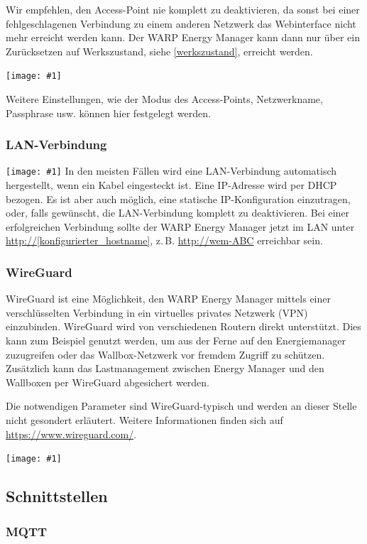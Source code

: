 \documentclass[a4paper,10pt]{article}
\newcommand{\hint}[1]{\begin{tcolorbox}[colback=boxgray,colframe=black,coltext=
white,title=Hinweis,left*=2mm,right*=2mm,boxsep=1mm,bottom=1mm,top=1mm]#1\end{tcolorbox}}
\newcommand{\gfx}[1]{\texttt{[image: \#1]}}
\begin{document}
\begin{multicols*}{2}
	\hint{Wir empfehlen, den Access-Point nie komplett zu deaktivieren, da sonst bei einer
		fehlgeschlagenen Verbindung zu einem anderen Netzwerk das Webinterface nicht mehr erreicht
		werden kann. Der WARP Energy Manager kann dann nur über ein Zurücksetzen auf Werkszustand, siehe \ref{werkszustand}, erreicht werden.}

	\gfx{./img/resized/web_wifi_ap}


	Weitere Einstellungen, wie der Modus des Access-Points,
	Netzwerkname, Passphrase usw. können hier festgelegt werden.

	\subsubsection{LAN-Verbindung}
	\gfx{./img/resized/web_ethernet}
	In den meisten Fällen wird eine
	LAN-Verbindung automatisch hergestellt, wenn ein Kabel eingesteckt ist.
	Eine IP-Adresse wird per DHCP bezogen. Es ist aber auch möglich,
	eine statische IP-Konfiguration	einzutragen, oder, falls gewünscht, die LAN-Verbindung
	komplett zu deaktivieren.
	Bei einer erfolgreichen Verbindung sollte der WARP Energy Manager jetzt im LAN unter
	\url{http://[konfigurierter_hostname]}, z.\,B. \url{http://wem-ABC} erreichbar sein.

	\subsubsection{WireGuard}

	WireGuard ist eine Möglichkeit, den WARP Energy Manager mittels einer verschlüsselten
	Verbindung in ein virtuelles privates Netzwerk (VPN) einzubinden. WireGuard wird von
	verschiedenen Routern direkt unterstützt. Dies kann zum Beispiel genutzt
	werden, um aus der Ferne auf den Energiemanager zuzugreifen oder das
	Wallbox-Netzwerk vor fremdem Zugriff zu schützen. Zusätzlich kann das
	Lastmanagement zwischen Energy Manager und den Wallboxen per WireGuard abgesichert werden.

	Die notwendigen Parameter sind WireGuard-typisch und werden an dieser Stelle
	nicht gesondert erläutert. Weitere Informationen finden sich auf
	\url{https://www.wireguard.com/}.

	\gfx{./img/resized/web_wireguard}

	\subsection{Schnittstellen}
	\subsubsection{MQTT}
	\label{mqtt-interface}


\end{multicols*}
\end{document}
